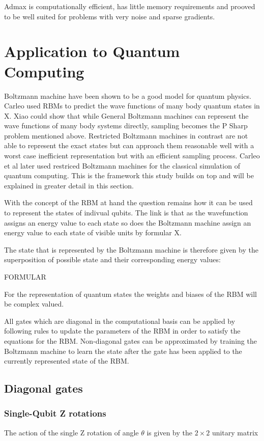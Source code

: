 Admax is computationally efficient, has little memory requirements and prooved to be well suited 
for problems with very noise and sparse gradients.

\section{Application to Quantum Computing}
\label{sec:applicationToQuantumComputing}
Boltzmann machine have been shown to be a good model for quantum physics. Carleo used RBMs to predict the wave functions 
of many body quantum states in X. Xiao could show that while General Boltzmann machines can represent the wave functions of 
many body systems directly, sampling becomes the P Sharp problem mentioned above. Restricted Boltzmann machines in contrast 
are not able to represent the exact states but can approach them reasonable well with a worst case inefficient representation 
but with an efficient sampling process. Carleo et al later used restriced Boltzmann machines for the classical simulation of 
quantum computing. This is the framework this study builds on top and will be explained in greater detail in this section.

With the concept of the RBM at hand the question remains how it can be used to represent the states of indivual qubits. The
link is that as the wavefunction assigns an energy value to each state so does the Boltzmann machine assign an energy value 
to each state of visible units by formular X.

The state that is represented by the Boltzmann machine is therefore given by the superposition of possible state and their 
corresponding energy values:

FORMULAR

For the representation of quantum states the weights and biases of the RBM will be complex valued.

All gates which are diagonal in the computational basis can be applied by following rules to update the parameters of the RBM
in order to satisfy the equations for the RBM. Non-diagonal gates can be approximated by training the Boltzmann machine to 
learn the state after the gate has been applied to the currently represented state of the RBM.

\subsection{Diagonal gates}
\subsubsection{Single-Qubit Z rotations}
The action of the single Z rotation of angle $\theta$ is given by the $2\times2$ unitary matrix


